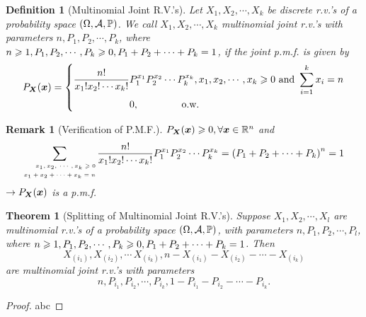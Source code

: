 \documentclass[openany,12pt]{book}
\newtheorem{theorem}{Theorem}[chapter]
\newtheorem{remark}{Remark}[chapter]
\newtheorem{definition}{Definition}[chapter]
\begin{document}
\begin{definition}[Multinomial Joint R.V.'s]
  Let $X_{1}, X_{2}, \cdots,X_{k}$ be discrete r.v.'s of a probability space $(\Omega,\mathcal{A},\mathbb{P})$. We call $X_{1}, X_{2}, \cdots,X_{k}$ multinomial joint r.v.'s with parameters $n,P_{1},P_{2}, \cdots,P_{k}$, where $n \geqslant 1, P_{1},P_{2}, \cdots,P_{k} \geqslant 0, P_{1} + P_{2} + \cdots + P_{k} = 1$, if the joint p.m.f. is given by
  \[P_{\bm{X}}(\bm{x})= \left\{ \begin{aligned}
      \frac{n!}{x_{1}!x_{2}!\cdots x_{k}!} & P_{1}^{x_{1}}P_{2}^{x_{2}}\cdots P_{k}^{x_{k}}, \mathrm{ }x_{1},x_{2}, \cdots,x_{k} \geqslant 0 ~\text{and}~ \sum_{i=1}^k x_i=n \\
                                           & 0, \qquad\qquad~\text{o.w.}~                                                                                              \\
    \end{aligned} \right.\]
\end{definition}

\begin{remark}[Verification of P.M.F.]
  $P_{\bm{X}}(\bm{x}) \geqslant 0, \forall\bm{x} \in \mathbb{R}^{n}$ and
  \[\sum_{\mbox{\tiny$\begin{aligned}
            x_{1},x_{2},\,\cdots, x_{k} \geqslant 0  \\
            x_{1} + x_{2} + \cdots + x_{k} = n \\
          \end{aligned}$}}^{}{\frac{n!}{x_{1}!x_{2}!\cdots x_{k}!}P_{1}^{x_{1}}P_{2}^{x_{2}}\cdots P_{k}^{x_{k}}} = \left( P_{1} + P_{2} + \cdots + P_{k} \right)^{n} = 1\]
  $\to P_{\bm{X}}(\bm{x})$ is a p.m.f.
\end{remark}

\begin{theorem}[Splitting of Multinomial Joint R.V.'s]
  Suppose $X_{1}, X_{2}, \cdots,X_{l}$ are multinomial r.v.'s of a probability space $(\Omega,\mathcal{A},\mathbb{P})$, with parameters $n,P_{1},P_{2}, \cdots,P_{l}$,
  where $n \geqslant 1, P_{1},P_{2}, \cdots,P_{k} \geqslant 0, P_{1} + P_{2} + \cdots + P_{k} = 1$. Then
  \[X_{(i_{1})},X_{(i_{2})},\cdots\,X_{\left( i_{k} \right)}, n - X_{\left( i_{1} \right)} - X_{\left( i_{2} \right)} - \cdots - X_{\left( i_{k} \right)}\]
  are multinomial joint r.v.'s with parameters \[n,P_{i_{1}},P_{i_{2}}, \cdots,P_{i_{k}}, 1 - P_{i_{1}} - P_{i_{2}} - \cdots - P_{i_{k}}.\]
\end{theorem}

\begin{proof}
  abc
\end{proof}
\end{document}
